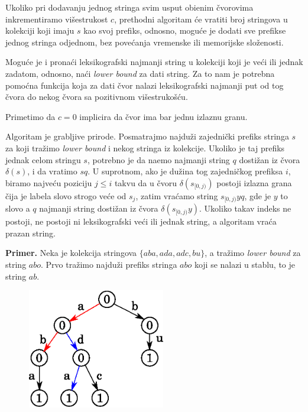 Ukoliko pri dodavanju jednog stringa svim usput obi\dj enim \v cvorovima inkrementiramo vi\v sestrukost $c$, prethodni algoritam \' ce vratiti broj stringova u kolekciji koji imaju $s$ kao svoj prefiks, odnosno, mogu\' ce je dodati sve prefikse jednog stringa odjednom, bez pove\' canja vremenske ili memorijske slo\v zenosti.

Mogu\' ce je i prona\' ci leksikografski najmanji string u kolekciji koji je ve\' ci ili jednak zadatom, odnosno, na\' ci \textit{lower bound} za dati string. Za to nam je potrebna pomo\' cna funkcija koja za dati \v cvor nalazi leksikografski najmanji put od tog \v cvora do nekog \v cvora sa pozitivnom vi\v sestruko\v s\' cu. 



Primetimo da $c=0$ implicira da \v cvor ima bar jednu izlaznu granu.

\noindent
\begin{minipage}[l]{\textwidth}

\end{minipage}

Algoritam je grabljive prirode. Posmatrajmo najdu\v zi zajedni\v cki prefiks stringa $s$ za koji tra\v zimo \textit{lower bound} i nekog stringa iz kolekcije. Ukoliko je taj prefiks jednak celom stringu $s$, potrebno je da na\dj emo najmanji string $q$ dosti\v zan iz \v cvora $\delta(s)$, i da vratimo $sq$. U suprotnom, ako je du\v zina tog zajedni\v ckog prefiksa $i$, biramo najve\' cu poziciju $j \leq i$ takvu da u \v cvoru $\delta(s_{[0, j)})$ postoji izlazna grana \v cija je labela slovo strogo ve\' ce od $s_j$, zatim vra\' camo string $s_{[0,j)}yq$, gde je $y$ to slovo a $q$ najmanji string dosti\v zan iz \v cvora $\delta(s_{[0,j)}y)$. Ukoliko takav indeks ne postoji, ne postoji ni leksikografski ve\' ci ili jednak string, a algoritam vra\' ca prazan string.

\noindent \textbf{Primer.} Neka je kolekcija stringova $\{aba, ada, adc, bu\}$, a tra\v zimo \textit{lower bound} za string $abo$. Prvo tra\v zimo najdu\v zi prefiks stringa $abo$ koji se nalazi u stablu, to je string $ab$.

\begin{figure}[H]
    \centering
    \includegraphics[width=60mm]{../img/trielb1.eps}
\end{figure}

